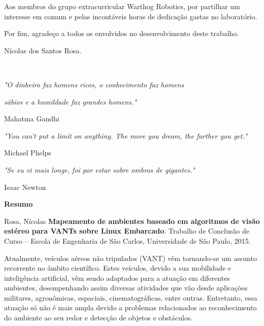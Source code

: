 Aos membros do grupo extracurricular Warthog Robotics, por partilhar um interesse em comum e pelas incontáveis horas de dedicação gastas no laboratório.

Por fim, agradeço a todos os envolvidos no desenvolvimento deste trabalho.

\begin{flushright}
Nícolas dos Santos Rosa.
\end{flushright}


\cleardoublepage

\
\vspace{0.76\textheight} 

\begin{flushright}

\textit{"O dinheiro faz homens ricos, o conhecimento faz homens }

\textit{sábios e a humildade faz grandes homens."}

Mahatma Gandhi

\textit{"You can't put a limit on anything. The more you dream, the farther you get."}

Michael Phelps

\textit{"Se eu vi mais longe, foi por estar sobre ombros de gigantes."}

Isaac Newton

\end{flushright}


\cleardoublepage

\vspace{0.11\textheight} 

\begin{center}
\textbf{\Huge{Resumo}}
\end{center}

\vspace{0.05\textheight}
Rosa, Nícolas \textbf{Mapeamento de ambientes baseado em algoritmos de visão estéreo para VANTs sobre Linux Embarcado}. Trabalho de Conclusão de Curso -- Escola de Engenharia de São Carlos, Universidade de São Paulo, 2015.

Atualmente, veículos aéreos não tripulados (VANT) vêm tornando-se um assunto recorrente no âmbito científico. Estes veículos, devido a sua mobilidade e inteligência artificial, vêm sendo adaptados para a atuação em diferentes ambientes, desempenhando assim diversas atividades que vão desde aplicações militares, agronômicas, espaciais, cinematográficas, entre outras. Entretanto, essa atuação só não é mais ampla devido a problemas relacionados ao reconhecimento do ambiente ao seu redor e detecção de objetos e obstáculos. 

